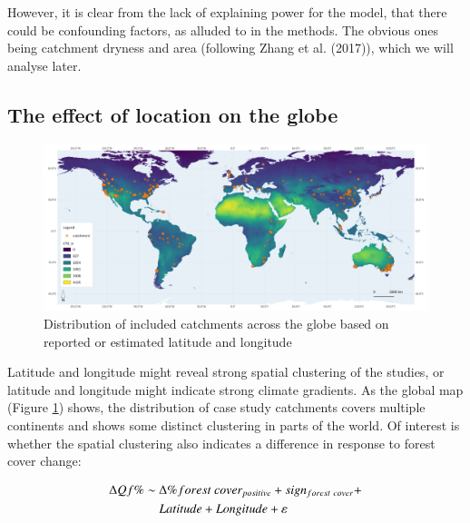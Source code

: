 \documentclass[]{elsarticle} %
\begin{document}
However, it is clear from the lack of explaining power for the model, that there could be confounding factors, as alluded to in the methods. The obvious ones being catchment dryness and area (following Zhang et al. (2017)), which we will analyse later.

\hypertarget{the-effect-of-location-on-the-globe}{%
\subsection{The effect of location on the globe}\label{the-effect-of-location-on-the-globe}}

\begin{figure}
\includegraphics[width=0.9\linewidth]{../../data/FAOET0data_final_2022} \caption{Distribution of included catchments across the globe based on reported or estimated latitude and longitude}\label{fig:globalmap}
\end{figure}

Latitude and longitude might reveal strong spatial clustering of the studies, or latitude and longitude might indicate strong climate gradients. As the global map (Figure \ref{fig:globalmap}) shows, the distribution of case study catchments covers multiple continents and shows some distinct clustering in parts of the world. Of interest is whether the spatial clustering also indicates a difference in response to forest cover change:

\begin{align}
\Delta Qf \% \sim ~ & \Delta \% forest~cover_{positive} + sign_{forest~cover} + \notag \\ &  Latitude + Longitude + \varepsilon \label{eq:eq4}
\end{align}
\end{document}
